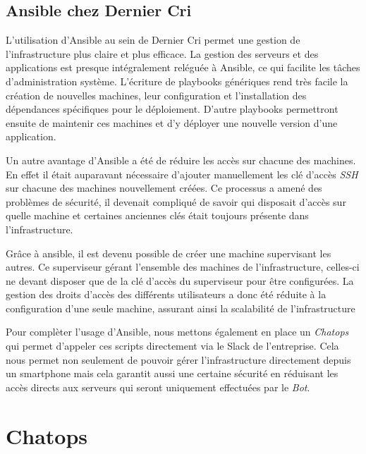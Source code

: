 \documentclass[12pt,a4paper]{article}
\begin{document}
  \newpage

  \subsection{Ansible chez Dernier Cri}\label{ansible-chez-dernier-cri}

  \bigskip

  L'utilisation d'Ansible au sein de Dernier Cri permet une gestion de
  l'infrastructure plus claire et plus efficace. La gestion des serveurs
  et des applications est presque intégralement reléguée à Ansible, ce qui
  facilite les tâches d'administration système. L'écriture de playbooks
  génériques rend très facile la création de nouvelles machines, leur
  configuration et l'installation des dépendances spécifiques pour le
  déploiement. D'autre playbooks permettront ensuite de maintenir ces
  machines et d'y déployer une nouvelle version d'une application.

  \bigskip

  Un autre avantage d'Ansible a été de réduire les accès sur chacune des
  machines. En effet il était auparavant nécessaire d'ajouter manuellement
  les clé d'accès \emph{SSH} sur chacune des machines nouvellement créées.
  Ce processus a amené des problèmes de sécurité, il devenait compliqué de
  savoir qui disposait d'accès sur quelle machine et certaines anciennes
  clés était toujours présente dans l'infrastructure.

  \bigskip

  Grâce à ansible, il est devenu possible de créer une machine supervisant
  les autres. Ce superviseur gérant l'ensemble des machines de
  l'infrastructure, celles-ci ne devant disposer que de la clé d'accès du
  superviseur pour être configurées. La gestion des droits d'accès des
  différents utilisateurs a donc été réduite à la configuration d'une
  seule machine, assurant ainsi la scalabilité de l'infrastructure

  \bigskip

  Pour complèter l'usage d'Ansible, nous mettons également en place un
  \emph{Chatops} qui permet d'appeler ces scripts directement via le Slack
  de l'entreprise. Cela nous permet non seulement de pouvoir gérer
  l'infrastructure directement depuis un smartphone mais cela garantit
  aussi une certaine sécurité en réduisant les accès directs aux serveurs
  qui seront uniquement effectuées par le \emph{Bot}.

  \newpage

  \section{Chatops}\label{chatops}
\end{document}
